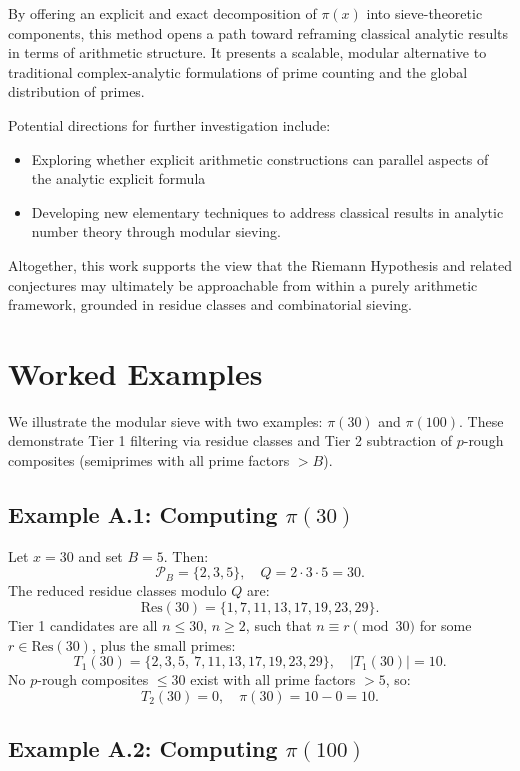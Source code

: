 \documentclass[11pt]{article}
\begin{document}
	By offering an explicit and exact decomposition of $\pi(x)$ into sieve-theoretic components, this method opens a path toward reframing classical analytic results in terms of arithmetic structure. It presents a scalable, modular alternative to traditional complex-analytic formulations of prime counting and the global distribution of primes.
	
	Potential directions for further investigation include:
	\begin{itemize}
		\item Exploring whether explicit arithmetic constructions can parallel aspects of the analytic explicit formula
		\item Developing new elementary techniques to address classical results in analytic number theory through modular sieving.
	\end{itemize}

	Altogether, this work supports the view that the Riemann Hypothesis and related conjectures may ultimately be approachable from within a purely arithmetic framework, grounded in residue classes and combinatorial sieving.
	
	
	\appendix
	\section{Worked Examples}
	
	We illustrate the modular sieve with two examples: $\pi(30)$ and $\pi(100)$. These demonstrate Tier 1 filtering via residue classes and Tier 2 subtraction of $p$-rough composites (semiprimes with all prime factors $> B$).
	
	\subsection{Example A.1: Computing $\pi(30)$}
	
	Let $x = 30$ and set $B = 5$. Then:
	\[
	\mathcal{P}_B = \{2, 3, 5\}, \quad Q = 2 \cdot 3 \cdot 5 = 30.
	\]
	The reduced residue classes modulo $Q$ are:
	\[
	\text{Res}(30) = \{1, 7, 11, 13, 17, 19, 23, 29\}.
	\]
	Tier 1 candidates are all $n \leq 30$, $n \geq 2$, such that $n \equiv r \pmod{30}$ for some $r \in \text{Res}(30)$, plus the small primes:
	\[
	T_1(30) = \{2, 3, 5,\ 7, 11, 13, 17, 19, 23, 29\}, \quad |T_1(30)| = 10.
	\]
	No $p$-rough composites $\leq 30$ exist with all prime factors $> 5$, so:
	\[
	T_2(30) = 0, \quad \pi(30) = 10 - 0 = 10.
	\]
	
	\subsection{Example A.2: Computing $\pi(100)$}
	
\end{document}
